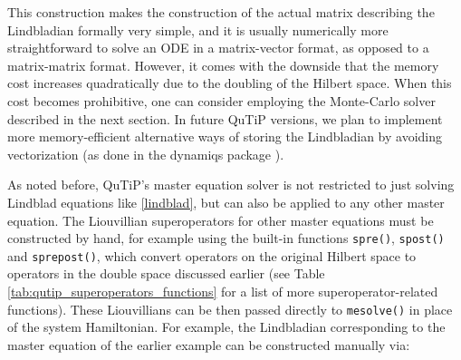 \documentclass[preprint,3p,sort&compress]{elsarticle}
\def\code#1{\texttt{#1}}
\begin{document}
This construction makes the construction of the actual matrix describing the Lindbladian formally very simple, and it is usually numerically more straightforward to solve an ODE in a matrix-vector format, as opposed to a matrix-matrix format.  However, it comes with the downside that the memory cost increases quadratically due to the doubling of the Hilbert space. When this cost becomes prohibitive, one can consider employing the Monte-Carlo solver described in the next section. In future QuTiP versions, we plan to implement more memory-efficient alternative ways of storing the Lindbladian by avoiding vectorization (as done in the dynamiqs package \cite{guilmin2024dynamiqs}).

As noted before, QuTiP's master equation solver is not restricted to just solving Lindblad equations like \eqref{lindblad}, but can also be applied to any other master equation.  The Liouvillian superoperators for other master equations must be constructed by hand, for example using the built-in functions \code{spre()}, \code{spost()} and \code{sprepost()}, which convert operators on the original Hilbert space to operators in the double space discussed earlier (see Table \ref{tab:qutip_superoperators_functions} for a list of more superoperator-related functions). These Liouvillians can be then passed directly to \code{mesolve()} in place of the system Hamiltonian.  For example, the Lindbladian corresponding to the master equation of the earlier example can be constructed manually via:

\end{document}
